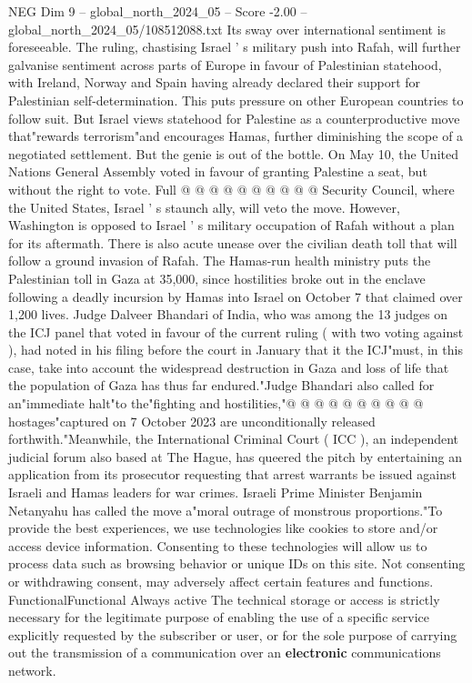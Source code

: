 \begin{textsample}{NEG Dim 9 – global\_north\_2024\_05 – Score -2.00 – global\_north\_2024\_05/108512088.txt}
Its sway over international sentiment is foreseeable.
The ruling, chastising Israel ' s military push into Rafah, will further galvanise sentiment across parts of Europe in favour of Palestinian statehood, with Ireland, Norway and Spain having already declared their support for Palestinian self-determination.
This puts pressure on other European countries to follow suit.
But Israel views statehood for Palestine as a counterproductive move that"rewards terrorism"and encourages Hamas, further diminishing the scope of a negotiated settlement.
But the genie is out of the bottle.
On May 10, the United Nations General Assembly voted in favour of granting Palestine a seat, but without the right to vote.
Full @ @ @ @ @ @ @ @ @ @ Security Council, where the United States, Israel ' s staunch ally, will veto the move.
However, Washington is opposed to Israel ' s military occupation of Rafah without a plan for its aftermath.
There is also acute unease over the civilian death toll that will follow a ground invasion of Rafah.
The Hamas-run health ministry puts the Palestinian toll in Gaza at 35,000, since hostilities broke out in the enclave following a deadly incursion by Hamas into Israel on October 7 that claimed over 1,200 lives.
Judge Dalveer Bhandari of India, who was among the 13 judges on the ICJ panel that voted in favour of the current ruling ( with two voting against ), had noted in his filing before the court in January that it the ICJ"must, in this case, take into account the widespread destruction in Gaza and loss of life that the population of Gaza has thus far endured."Judge Bhandari also called for an"immediate halt"to the"fighting and hostilities,"@ @ @ @ @ @ @ @ @ @ hostages"captured on 7 October 2023 are unconditionally released forthwith."Meanwhile, the International Criminal Court ( ICC ), an independent judicial forum also based at The Hague, has queered the pitch by entertaining an application from its prosecutor requesting that arrest warrants be issued against Israeli and Hamas leaders for war crimes.
Israeli Prime Minister Benjamin Netanyahu has called the move a"moral outrage of monstrous proportions."To provide the best experiences, we use technologies like cookies to store and/or access device information.
Consenting to these technologies will allow us to process data such as browsing behavior or unique IDs on this site.
Not consenting or withdrawing consent, may adversely affect certain features and functions.
FunctionalFunctional Always active The technical storage or access is strictly necessary for the legitimate purpose of enabling the use of a specific service explicitly requested by the subscriber or user, or for the sole purpose of carrying out the transmission of a communication over an \textbf{electronic} communications network.

\end{textsample}
